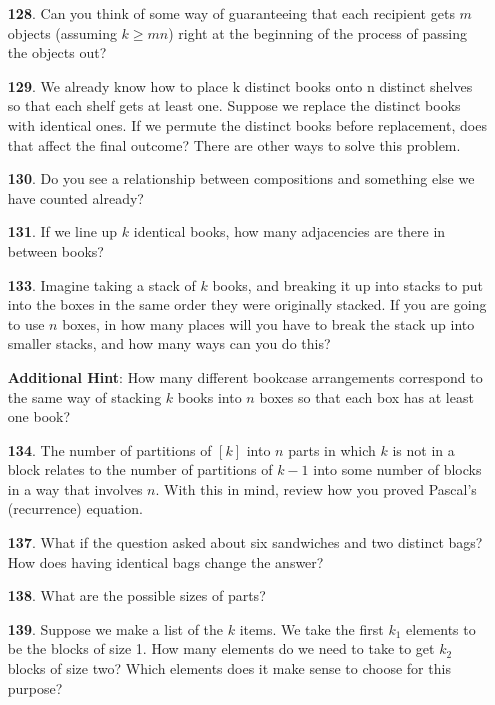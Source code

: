 \documentclass[10pt,]{book}
\theoremstyle{plain}
\theoremstyle{definition}
\theoremstyle{definition}
\numberwithin{equation}{chapter}
\begin{document}
\begin{itemize}[itemsep=1em]
\item[\textbf{128}.]Can you think of some way of guaranteeing that each recipient gets \(m\) objects (assuming \(k \ge mn\)) right at the beginning of the process of passing the objects out?%

\item[\textbf{129}.]We already know how to place k distinct books onto n distinct shelves so that each shelf gets at least one. Suppose we replace the distinct books with identical ones. If we permute the distinct books before replacement, does that affect the final outcome? There are other ways to solve this problem.%

\item[\textbf{130}.]Do you see a relationship between compositions and something else we have counted already?%

\item[\textbf{131}.]If we line up \(k\) identical books, how many adjacencies are there in between books?%

\item[\textbf{133}.]Imagine taking a stack of \(k\) books, and breaking it up into stacks to put into the boxes in the same order they were originally stacked. If you are going to use \(n\) boxes, in how many places will you have to break the stack up into smaller stacks, and how many ways can you do this?%

\par\smallskip
\noindent\textbf{Additional Hint}: How many different bookcase arrangements correspond to the same way of stacking \(k\) books into \(n\) boxes so that each box has at least one book?%

\item[\textbf{134}.]The number of partitions of \([k]\) into \(n\) parts in which \(k\) is not in a block relates to the number of partitions of \(k-1\) into some number of blocks in a way that involves \(n\). With this in mind, review how you proved Pascal's (recurrence) equation.%

\item[\textbf{137}.]What if the question asked about six sandwiches and two distinct bags? How does having identical bags change the answer?%

\item[\textbf{138}.]What are the possible sizes of parts?%

\item[\textbf{139}.]Suppose we make a list of the \(k\) items. We take the first \(k_1\) elements to be the blocks of size 1. How many elements do we need to take to get \(k_2\) blocks of size two? Which elements does it make sense to choose for this purpose?%


\end{itemize}
\end{document}
